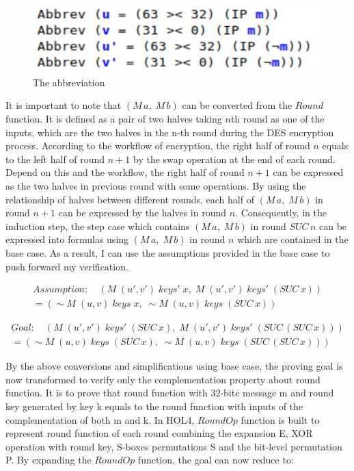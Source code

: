 \documentclass{article}
\begin{document}
\begin{figure}
\centering
\includegraphics[width=0.25\linewidth]{abbr1}
\caption{\label{fig:form4} The abbreviation}
\end{figure}

It is important to note that $(M \,a,\;M \,b)$ can be converted from the $Round$ function. It is defined as a pair of two
halves taking $n$th round as one of the inputs,
which are the two halves in the n-th round during the DES encryption process. According to the workflow of encryption, the right
half of round $n$ equals to the left half of round $n+1$ by the swap operation at the end of each round. Depend on this and the workflow,
the right half of round $n+1$ can be expressed as the two halves in previous round with some operations.
By using the relationship of halves between different rounds,
each half of $(M \,a,\;M \,b)$ in round $n+1$ can be expressed by the halves in round $n$. Consequently, in the induction step,
the step case which contains $(M \,a,\;M \,b)$ in round $SUC \,n$ can be expressed into formulas using $(M \,a,\;M \,b)$ in round
$n$ which are contained in the base case. As a result, I can use the assumptions provided in the base case to push forward my
verification.

\begin{multline}
Assumption: \quad (M \; (u', v') \; keys' \; x, \; M \; (u', v') \; keys' \; (SUC \, x)) \\
= (\sim M \; (u, v) \; keys \; x, \; \sim M \; (u, v) \; keys \; (SUC \, x))
\end{multline}

\begin{multline}
Goal: \quad (M \; (u', v') \; keys' \; (SUC \,x), \; M \; (u', v') \; keys' \; (SUC \,(SUC \, x))) \\
= (\sim M \; (u, v) \; keys \; (SUC \,x), \; \sim M \; (u, v) \; keys \; (SUC \,(SUC \, x)))
\end{multline}

By the above conversions and simplifications using base case, the proving goal is now transformed to verify only the
complementation property about round function. It is to prove that round function with 32-bite message m and round
key generated by key k equals to the round function with inputs of
the complementation of both m and k. In HOL4, $RoundOp$ function is built to represent round function of each round
combining the expansion E, XOR operation with round key, S-boxes permutations S and the bit-level permutation P. By expanding
the $RoundOp$ function, the goal can now reduce to:
\end{document}
